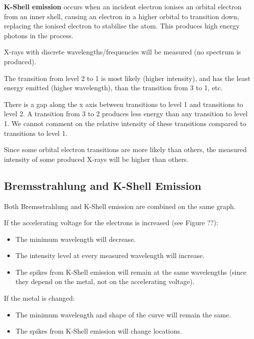 \documentclass[a4paper,11pt]{report}
\begin{document}

\textbf{K-Shell emission} occurs when an incident electron ionises an orbital
electron from an inner shell, causing an electron in a higher orbital to
transition down, replacing the ionised electron to stabilise the atom. This
produces high energy photons in the process.

X-rays with discrete wavelengths/frequencies will be measured (no spectrum is
produced).

The transition from level 2 to 1 is most likely (higher intensity), and has
the least energy emitted (higher wavelength), than the transition from 3 to 1,
etc.

There is a gap along the x axis between transitions to level 1 and transitions
to level 2. A transition from 3 to 2 produces less energy than any transition
to level 1. We cannot comment on the relative intensity of these transitions
compared to transitions to level 1.

Since some orbital electron transitions are more likely than others, the
measured intensity of some produced X-rays will be higher than others.

\subsection{Bremsstrahlung and K-Shell Emission}


Both Bremsstrahlung and K-Shell emission are combined on the same graph.

If the accelerating voltage for the electrons is increased (see Figure ??):

\begin{itemize}
\item The minimum wavelength will decrease.
\item The intensity level at every measured wavelength will increase.
\item The spikes from K-Shell emission will remain at the same wavelengths
	(since they depend on the metal, not on the accelerating voltage).
\end{itemize}

If the metal is changed:

\begin{itemize}
\item The minimum wavelength and shape of the curve will remain the same.
\item The spikes from K-Shell emission will change locations.
\end{itemize}
\end{document}
